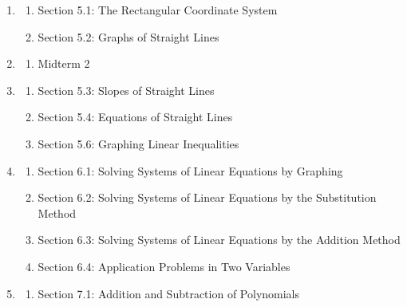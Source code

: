 \documentclass{ximera}
\begin{document}
\begin{enumerate}
\begin{enumerate}
        \item Application 2: Integer, Coins, and Stamps Problems
        \item Section 4.2: Geometry Problems
        \item Section 4.3: Markup and Discount Problems
        \item Section 4.4: Investment Problems
        \item Section 4.5: Mixture Problems
        \item Section 4.6: Uniform Motion Problems
        \item Section 4.7: Inequalities
    \end{enumerate}
    \item
    \begin{enumerate}
        \item Section 5.1: The Rectangular Coordinate System
        \item Section 5.2: Graphs of Straight Lines
    \end{enumerate}
    \item
    \begin{enumerate}
        \item Midterm 2
    \end{enumerate}
    \item
    \begin{enumerate}
        \item Section 5.3: Slopes of Straight Lines
        \item Section 5.4: Equations of Straight Lines
        \item Section 5.6: Graphing Linear Inequalities
    \end{enumerate}
    \item 
    \begin{enumerate}
        \item Section 6.1: Solving Systems of Linear Equations by Graphing
        \item Section 6.2: Solving Systems of Linear Equations by the Substitution Method
        \item Section 6.3: Solving Systems of Linear Equations by the Addition Method
        \item Section 6.4: Application Problems in Two Variables
    \end{enumerate}
    \item 
    \begin{enumerate}
        \item Section 7.1: Addition and Subtraction of Polynomials

\end{enumerate}
\end{enumerate}
\end{document}
